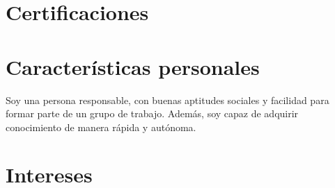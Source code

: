 \documentclass[12pt,a4paper]{moderncv}
\begin{document}
\section{Certificaciones}
\section{Características personales}
Soy una persona responsable, con buenas aptitudes sociales y facilidad para formar parte de un grupo de trabajo. Además, soy capaz de adquirir  conocimiento de manera rápida y autónoma.
\section{Intereses}
\renewcommand{\listitemsymbol}{} %
\end{document}
